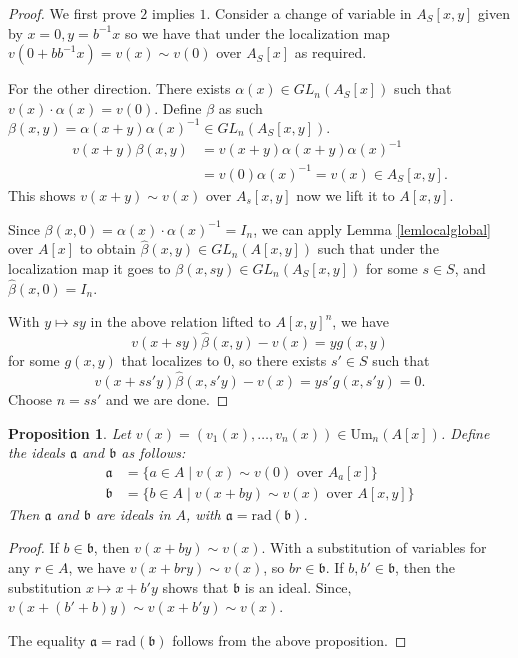 \documentclass[12pt]{report}
\numberwithin{equation}{section}
\newcounter{dummy} \numberwithin{dummy}{section}
\newtheorem{proposition}[dummy]{Proposition}
\begin{document}
	\begin{proof}
	We first prove $2$ implies $1$. Consider a change of variable in $A_S[x,y]$ given by $x=0, y=b^{-1}x$ so we have that under the localization map $v(0+b b^{-1}x ) = v(x) \sim v(0) $ over $A_S[x]$ as required.
	
	For the other direction.
	There exists \( \alpha(x) \in GL_n(A_S[x]) \) such that \( v(x) \cdot \alpha(x) = v(0) \). Define $\beta$ as such  
	\(
	\beta(x, y) = \alpha(x + y) \alpha(x)^{-1} \in GL_n(A_S[x, y]).
	\)
	\begin{align*}
			v(x + y)  \beta(x, y) &= v(x + y)  \alpha(x + y)  \alpha(x)^{-1}\\
			&=v(0) \alpha(x)^{-1} = v(x) \in A_S[x,y].
	\end{align*}
	This shows $v(x+y) \sim v(x) $ over $A_s[x,y]$ now we lift it to $A[x,y]$.
	
	Since \( \beta(x, 0) = \alpha(x) \cdot \alpha(x)^{-1} = I_n \), we can apply Lemma \ref{lemlocalglobal} over \( A[x] \) to obtain \( \hat{\beta}(x, y) \in GL_n(A[x, y]) \) such that under the localization map it goes to \( \beta(x, sy) \in GL_n(A_S[x,y])\) for some \( s \in S \), and \( \hat{\beta}(x, 0) = I_n \). 
	
	With $y\mapsto sy$ in the above relation lifted to \( A[x, y]^n \), we have  
	\[
	v(x + sy)  \hat{\beta}(x, y) - v(x) = y  g(x, y)
	\]
	for some \( g(x, y) \) that localizes to 0, so there exists \( s' \in S \) such that 
	\[
	v(x + ss'y) \hat{\beta}(x, s'y) - v(x) = y  s' g(x, s'y) = 0.
	\]
	Choose $n=ss' $ and we are done.
	\end{proof}
		
	\begin{proposition}
		Let $v(x) = (v_1(x), \dots, v_n(x)) \in \mathrm{Um}_n(A[x])$. Define the ideals $\mathfrak{a}$ and $\mathfrak{b}$ as follows:
		\begin{align*} \mathfrak{a} &= \{a \in A \mid v(x) \sim v(0) \text{ over } A_a[x] \} \\ \mathfrak{b} &= \{b \in A \mid v(x + by) \sim v(x) \text{ over } A[x, y] \} \end{align*} 
		Then $\mathfrak{a}$ and $\mathfrak{b}$ are ideals in $A$, with $\mathfrak{a} = \text{rad}(\mathfrak{b})$.
	\end{proposition}
	
	\begin{proof}
		If $b \in \mathfrak{b}$, then $v(x + by) \sim v(x)$.  With a substitution of variables for any $r \in A$, we have $v(x +bry) \sim v(x)$, so $br \in \mathfrak{b}$.  If $b, b' \in \mathfrak{b}$, then the substitution $x \mapsto x+b'y$ shows that $\mathfrak{b}$ is an ideal. Since, $ v(x+(b'+b)y) \sim v(x+b'y) \sim v(x)$.
		
		 The equality $\mathfrak{a} = \text{rad}(\mathfrak{b})$ follows from the above proposition.
	\end{proof}
	
\end{document}
